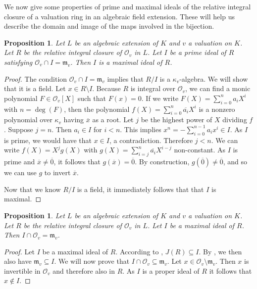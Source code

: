 \documentclass[12pt,a4paper]{amsart}
\newtheorem{prop}[thm]{Proposition}
\theoremstyle{definition}
\begin{document}
We now give some properties of prime and maximal ideals of the relative integral closure of a valuation ring in an algebraic field extension.
These will help us describe the domain and image of the maps involved in the bijection.
\begin{prop}{\label{prime}}
Let $L$ be an algebraic extension of $K$ and $v$ a valuation on $K$.
Let $R$ be the relative integral closure of $\mathcal{O}_v$ in $L$.
Let $I$ be a prime ideal of $R$ satisfying $\mathcal{O}_v\cap I=\mathfrak{m}_v$.
Then $I$ is a maximal ideal of $R$.
\end{prop}
\begin{proof}
The condition $\mathcal{O}_v\cap I=\mathfrak{m}_v$ implies that $R/I$ is a $\kappa_v$-algebra.
We will show that it is a field.
Let $x\in R\setminus I$.
Because $R$ is integral over $\mathcal{O}_v$, we can find a monic polynomial $F\in \mathcal{O}_v[X]$ such that $F(x)=0$.
If we write $F(X)=\sum_{i=0}^na_iX^i$ with $n=\deg(F)$, then the polynomial $f(X)=\sum_{i=0}^n\overline{a_i}X^i$ is a nonzero polynomial over $\kappa_v$ having $\overline{x}$ as a root.
Let $j$ be the highest power of $X$ dividing $f$.
Suppose $j=n$. Then $a_i\in I$ for $i<n$.
This implies $x^n=-\sum_{i=0}^{n-1}a_ix^i\in I$. As $I$ is prime, we would have that $x\in I$, a contradiction.
Therefore $j<n$.
We can write $f(X)=X^jg(X)$ with $g(X)=\sum_{i=j}^n\overline{a_i}X^{i-j}$ non-constant.
As $I$ is prime and $\overline{x}\neq\overline{0}$, it follows that $g(\overline{x})=\overline{0}$.
By construction, $g\left(\overline{0}\right)\neq\overline{0}$, and so we can use $g$ to invert $\overline{x}$.

Now that we know $R/I$ is a field, it immediately follows that that $I$ is maximal.
\end{proof}
\begin{prop}{\label{ex}}
Let $L$ be an algebraic extension of $K$ and $v$ a valuation on $K$.
Let $R$ be the relative integral closure of $\mathcal{O}_v$ in $L$.
Let $I$ be a maximal ideal of $R$.
Then $I\cap \mathcal{O}_v=\mathfrak{m}_v$.
\end{prop}
\begin{proof}
Let $I$ be a maximal ideal of $R$.
According to , $J(R)\subseteq I$.
By , we then also have $\mathfrak{m}_v\subseteq I$.
We will now prove that $I\cap \mathcal{O}_v\subseteq\mathfrak{m}_v$.
Let $x\in \mathcal{O}_v\setminus \mathfrak{m}_v$.
Then $x$ is invertible in $\mathcal{O}_v$ and therefore also in $R$.
As $I$ is a proper ideal of $R$ it follows that $x\notin I$.
\end{proof}
\end{document}
